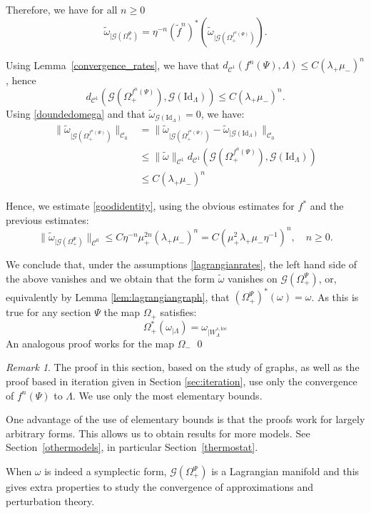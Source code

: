 \documentclass[11pt]{amsart}
\theoremstyle{definition}
\theoremstyle{remark}
\newtheorem{rem}[thm]{Remark}
\numberwithin{equation}{section}
\newcommand{\C}{\mathcal{C}}
\newcommand{\G}{\mathcal{G}}
\begin{document}
Therefore, we have for all $n\ge 0$
  \begin{equation}\label{goodidentity}
 \tilde \omega_{\mid\G(\Omega_+^ \Psi)}=\eta^{-n}({\tilde f}^{n})^* (
  \tilde{\omega}_{\mid\G(\Omega_+^{f^n(\Psi)})} ) .
  \end{equation}

  Using Lemma~\ref{convergence_rates},
  we have that
  $d_{\C^1}( f^n(\Psi), \Lambda)  \le C (\lambda_+ \mu_-)^n $,
  hence
  \[
d_{\C^1}\left( \G(\Omega_+^{f^n(\Psi)}), \G( \textrm{Id}_{\Lambda})\right )
    \le  C (\lambda_+ \mu_-)^n .
    \]
    Using \eqref{doundedomega} and that
    $\tilde{\omega}_{\G( \textrm{Id}_{\Lambda})} = 0 $,
    we have:
    \[
    \begin{split}
  \| \tilde{\omega}_{\mid\G(\Omega_+^{f^n(\Psi)})}  \|_{\C_0}
  & =   \| \tilde{\omega}_{\mid\G(\Omega_+^{f^n(\Psi)})} -
\tilde{\omega}_{\mid\G( \textrm{Id}_{\Lambda})} \|_{\C_0} \\
  & \le\|\tilde \omega\|_{\C^1}
  d_{\C^1}( \G(\Omega_+^{f^n(\Psi)}), \G( \textrm{Id}_{\Lambda}))\\
    & \le C (\lambda_+ \mu_- )^n
    \end{split}
    \]

    Hence, we estimate  \eqref{goodidentity},
    using the obvious estimates for $f^*$ and the
    previous  estimates:
    \[
    \|\tilde{ \omega}_{\mid\G(\Omega_+^ \Psi)}\|_{\C^0} \le C \eta^{-n} \mu^{2n}_+ (\lambda_+ \mu_-)^n
    = C (\mu^{2}_+ \lambda_+ \mu_-\eta^{-1})^n, \quad n \ge 0 .
    \]

    We conclude that, under the assumptions \eqref{lagrangianrates}, the left hand side of the above vanishes and we obtain that
the form $\tilde \omega$ vanishes on $\G(\Omega_+^ \Psi)$,
or, equivalently by Lemma \ref{lem:lagrangiangraph}, that $(\Omega_+^ \Psi)^* (\omega)=\omega$.
As this is true for any section $\Psi$ the map $\Omega_+$ satisfies:
    \[
    \Omega^*_+(\omega_{\mid \Lambda}) = \omega_{\mid W^{s,\mathrm{loc}}_\Lambda}
    \]
    An analogous proof works for the map $\Omega_-$
  \qed

  \begin{rem}
The proof in this section,  based on
 the study of graphs, as well as the proof
 based in iteration  given in Section \ref{sec:iteration},
use only the convergence of $f^n(\Psi)$ to $\Lambda$. We use only the
most elementary bounds.

One advantage of the use of  elementary bounds is that the
proofs
work for largely arbitrary forms.  This allows us
to obtain results for more models. See Section~\ref{othermodels},
in  particular Section~\ref{thermostat}.

When $\omega$ is indeed a symplectic form, $\G(\Omega_+^ \Psi)$ is a Lagrangian manifold and
this gives extra properties to study the convergence of approximations and perturbation theory.
\end{rem}
\end{document}

